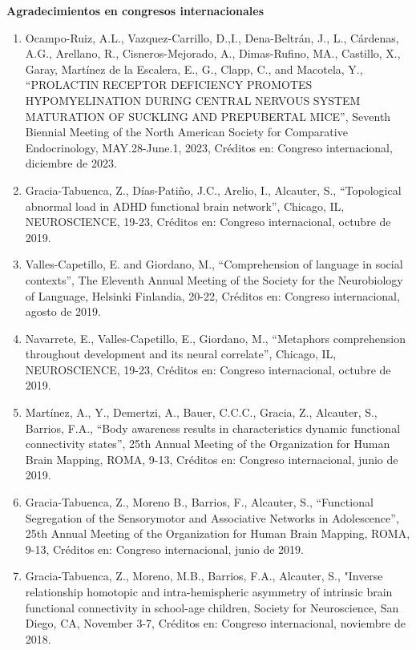 \textbf{Agradecimientos en congresos internacionales}

\hfill

\begin{enumerate}

\item Ocampo-Ruiz, A.L., Vazquez-Carrillo, D.,I., Dena-Beltrán, J., L., Cárdenas, A.G., Arellano, R., Cisneros-Mejorado, A., 
Dimas-Rufino, MA., Castillo, X., Garay, Martínez de la Escalera, E., G., Clapp, C., and Macotela, Y., “PROLACTIN RECEPTOR 
DEFICIENCY PROMOTES HYPOMYELINATION DURING CENTRAL NERVOUS SYSTEM MATURATION OF SUCKLING AND PREPUBERTAL MICE”, Seventh 
Biennial Meeting of the North American Society for Comparative Endocrinology, MAY.28-June.1, 2023, Créditos en: Congreso 
internacional, diciembre de 2023.

\item Gracia-Tabuenca, Z., Días-Patiño, J.C., Arelio, I., Alcauter, S., “Topological abnormal load in ADHD functional brain 
network”, Chicago, IL, NEUROSCIENCE, 19-23, Créditos en: Congreso internacional, octubre de 2019.

\item Valles-Capetillo, E. and Giordano, M., “Comprehension of language in social contexts”, The Eleventh Annual Meeting of 
the Society for the Neurobiology of Language, Helsinki Finlandia, 20-22, Créditos en: Congreso internacional, agosto de 
2019.

\item Navarrete, E., Valles-Capetillo, E., Giordano, M., “Metaphors comprehension throughout development and its neural 
correlate”, Chicago, IL, NEUROSCIENCE, 19-23, Créditos en: Congreso internacional, octubre de 2019.

\item Martínez, A., Y., Demertzi, A., Bauer, C.C.C., Gracia, Z., Alcauter, S., Barrios, F.A., “Body awareness results in 
characteristics dynamic functional connectivity states”, 25th Annual Meeting of the Organization for Human Brain Mapping, 
ROMA, 9-13, Créditos en: Congreso internacional, junio de 2019.

\item Gracia-Tabuenca, Z., Moreno B., Barrios, F., Alcauter, S., “Functional Segregation of the Sensorymotor and Associative 
Networks in Adolescence”, 25th Annual Meeting of the Organization for Human Brain Mapping, ROMA, 9-13, Créditos en: 
Congreso internacional, junio de 2019.

\item Gracia-Tabuenca, Z., Moreno, M.B., Barrios, F.A., Alcauter, S., "Inverse relationship homotopic and intra-hemispheric 
asymmetry of intrinsic brain functional connectivity in school-age children, Society for Neuroscience, San Diego, CA, 
November 3-7, Créditos en: Congreso internacional, noviembre de 2018.


\end{enumerate}
